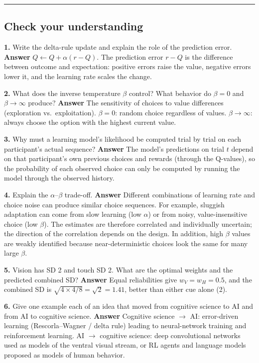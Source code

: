 \begin{center}\rule{0.5\linewidth}{0.5pt}\end{center}

\subsection{Check your understanding}

\textbf{1.} Write the delta-rule update and explain the role of the
prediction error. \textbf{Answer} \(Q \leftarrow Q + \alpha(r - Q)\).
The prediction error \(r - Q\) is the difference between outcome and
expectation: positive errors raise the value, negative errors lower it,
and the learning rate scales the change.

\textbf{2.} What does the inverse temperature \(\beta\) control? What
behavior do \(\beta = 0\) and \(\beta \to \infty\) produce?
\textbf{Answer} The sensitivity of choices to value differences
(exploration vs.~exploitation). \(\beta = 0\): random choice regardless
of values. \(\beta \to \infty\): always choose the option with the
highest current value.

\textbf{3.} Why must a learning model's likelihood be computed trial by
trial on each participant's actual sequence? \textbf{Answer} The model's
predictions on trial \(t\) depend on that participant's own previous
choices and rewards (through the Q-values), so the probability of each
observed choice can only be computed by running the model through the
observed history.

\textbf{4.} Explain the \(\alpha\)--\(\beta\) trade-off. \textbf{Answer}
Different combinations of learning rate and choice noise can produce
similar choice sequences. For example, sluggish adaptation can come from
slow learning (low \(\alpha\)) or from noisy, value-insensitive choice
(low \(\beta\)). The estimates are therefore correlated and individually
uncertain; the direction of the correlation depends on the design. In
addition, high \(\beta\) values are weakly identified because
near-deterministic choices look the same for many large \(\beta\).

\textbf{5.} Vision has SD 2 and touch SD 2. What are the optimal weights
and the predicted combined SD? \textbf{Answer} Equal reliabilities give
\(w_V = w_H = 0.5\), and the combined SD is
\(\sqrt{4 \times 4/8} = \sqrt{2} = 1.41\), better than either cue alone
(2).

\textbf{6.} Give one example each of an idea that moved from cognitive
science to AI and from AI to cognitive science. \textbf{Answer}
Cognitive science \ensuremath{\rightarrow} AI: error-driven learning (Rescorla--Wagner / delta
rule) leading to neural-network training and reinforcement learning. AI
\ensuremath{\rightarrow} cognitive science: deep convolutional networks used as models of the
ventral visual stream, or RL agents and language models proposed as
models of human behavior.

